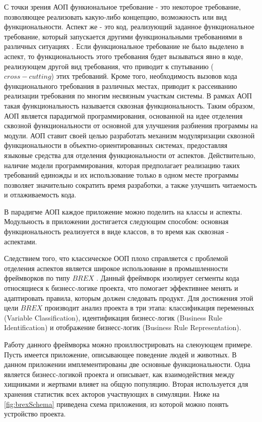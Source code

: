 С точки зрения АОП функиональное требование - это некоторое требование, позволяющее реализовать какую-либо концепцию, возможность или вид функциональности. Аспект же - это код, реализующий заданное функциональное требование, который запускается другими функциональными требованиями в различных ситуациях \cite{zhemzhicky}. Если функциональное требование не было выделено в аспект, то функциональность этого требования будет вызываться явно в коде, реализующем другой вид требования, что приводит к спутыванию ($cross-cutting$) этих требований. Кроме того, необходимость вызовов кода функционального требования в различных местах, приводит к рассеиванию реализации требования по многим несвязным участкам системы. В рамках АОП такая функциональность называется сквозная функциональность. Таким образом, АОП является парадигмой программирования, основанной на идее отделения сквозной функциональности от основной для улучшения разбиения программы на модули. АОП ставит своей целью разработать механизм модуляризации сквозной функциональности в объектно-ориентированных системах, предоставляя языковые средства для отделения функциональности от аспектов. Действительно, наличие модели программирования, которая предполагает реализацию таких требований единожды и их использование только в одном месте программы позволяет значительно сократить время разработки, а также улучшить читаемость и отлаживаемость кода.

В парадигме АОП каждое приложение можно поделить на классы и аспекты. Модульность в приложении достигается следующим способом: основная функциональность реализуется в виде классов, в то время как сквозная - аспектами.

Следствием того, что классическое ООП плохо справляется с проблемой отделения аспектов является широкое использование в промышленности фреймворков по типу $BREX$ \cite{brex}. Данный фреймворк изолирует сегменты кода относящиеся к бизнесс-логике проекта, что помогает эффективнее менять и адаптировать правила, которым должен следовать продукт. Для достижения этой цели $BREX$ производит анализ проекта в три этапа: классификация переменных (Variable Classification), идентификация бизнесс-логик (Business Rule Identification) и отображение бизнесс-логик (Business Rule Representation).

Работу данного фреймворка можно проиллюстрировать на слеюующем примере. Пусть имеется приложение, описывающее поведение людей и животных. В данном приложении имплементированы две основные функциональности. Одна является бизнесс-логикой проекта и описывает, как взаимодействия между хищниками и жертвами влияет на общую популяцию. Вторая используется для хранения статистик всех акторов участвующих в симуляции. Ниже на \autoref{fig:brexSchema} приведена схема приложения, из которой можно понять устройство проекта.

